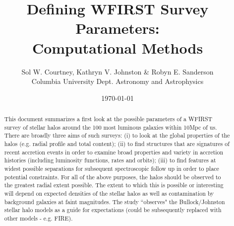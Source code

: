 \documentclass[11pt,a4paper,fleqn,notitlepage,oneside]{article}
\begin{document}
	\title{Defining WFIRST Survey Parameters: \\ Computational Methods}
	\author{Sol W. Courtney, Kathryn V. Johnston \& Robyn E. Sanderson \\ Columbia University Dept. Astronomy and Astrophysics}
	\date{\today}
	\maketitle
	
	\begin{abstract}
		This document summarizes a first look at the possible parameters of a WFIRST survey of stellar halos around the 100 most luminous galaxies within 10Mpc of us. 
		There are broadly three aims of such surveys: (i) to look at the global properties of the halos (e.g. radial profile and total content); (ii) to find structures that are signatures of recent accretion events in order to examine broad properties and variety in accretion histories (including luminosity functions, rates and orbits); (iii) to find features at widest possible separations for subsequent spectroscopic follow up in order to place potential constraints.
		For all of the above purposes, the halos should be observed to the greatest radial extent possible.
		The extent to which this is possible or interesting will depend on expected densities of the stellar halos as well as contamination by background galaxies at faint magnitudes.
		The study “observes" the Bullock/Johnston stellar halo models as a guide for expectations (could be subsequently replaced with other models - e.g. FIRE).
	\end{abstract}

\end{document}
